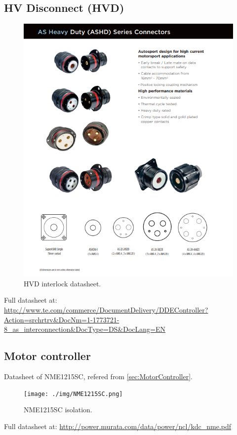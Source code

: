 \subsection{HV Disconnect (HVD)}

\begin{figure}[H]
	\centering
	\includegraphics[width=\textwidth]{./img/app-HVD.png}
	\caption{HVD interlock datasheet.}
	\label{app:HVD}
\end{figure}

Full datasheet at: \url{http://www.te.com/commerce/DocumentDelivery/DDEController?Action=srchrtrv&DocNm=1-1773721-8_as_interconnection&DocType=DS&DocLang=EN}

\subsection{Motor controller}

Datasheet of NME1215SC, refered from \ref{sec:MotorController}.
\begin{figure}[H]
	\centering
	\texttt{[image: ./img/NME1215SC.png]}
	\caption{NME1215SC isolation.}
	\label{app:NME1215SC}
\end{figure}
Full datasheet at: \url{http://power.murata.com/data/power/ncl/kdc_nme.pdf}

